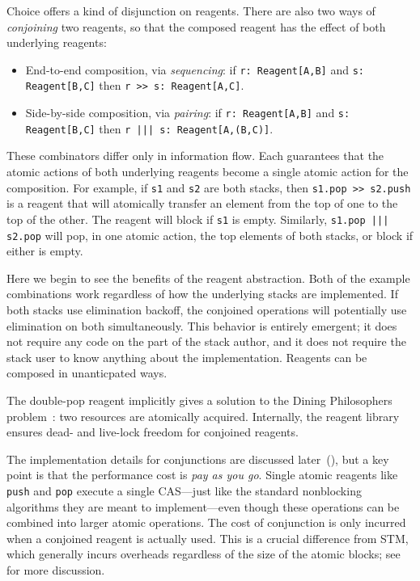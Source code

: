 \documentclass[preprint]{sigplanconf}
\begin{document}
Choice offers a kind of disjunction on reagents.  There are also two
ways of \emph{conjoining} two reagents, so that the composed reagent
has the effect of both underlying reagents:
\begin{itemize} %
\item End-to-end composition, via \emph{sequencing}: if 
  \lstinline{r: Reagent[A,B]} and \lstinline{s: Reagent[B,C]} then 
  \lstinline{r >> s: Reagent[A,C]}.
\item Side-by-side composition, via \emph{pairing}: if 
  \lstinline{r: Reagent[A,B]} and \lstinline{s: Reagent[B,C]} then 
  \lstinline{r ||| s: Reagent[A,(B,C)]}.  
\end{itemize}
These combinators differ only in information flow.  Each guarantees
that the atomic actions of both underlying reagents become a single
atomic action for the composition.  For example, if \lstinline{s1} and
\lstinline{s2} are both stacks, then \lstinline{s1.pop >> s2.push} is
a reagent that will atomically transfer an element from the top of one
to the top of the other.  The reagent will block if \lstinline{s1} is
empty.  Similarly, \lstinline{s1.pop ||| s2.pop} will pop, in one
atomic action, the top elements of both stacks, or block if either is
empty.

Here we begin to see the benefits of the reagent abstraction.  Both of
the example combinations work regardless of how the underlying stacks
are implemented.  If both stacks use elimination backoff, the
conjoined operations will potentially use elimination on both
simultaneously.  This behavior is entirely emergent; it does not
require any code on the part of the stack author, and it does not
require the stack user to know anything about the implementation.
Reagents can be composed in unanticpated ways.

The double-pop reagent implicitly gives a solution to the Dining
Philosophers problem~\cite{?}: two resources are atomically acquired.
Internally, the reagent library ensures dead- and live-lock freedom
for conjoined reagents.

The implementation details for conjunctions are discussed
later~(), but a key point is that the performance cost
is \emph{pay as you go}.  Single atomic reagents like \lstinline{push} and
\lstinline{pop} execute a single CAS---just like the standard nonblocking
algorithms they are meant to implement---even though these operations can be
combined into larger atomic operations.  The cost of conjunction is only
incurred when a conjoined reagent is actually used.  This is a crucial
difference from STM, which generally incurs overheads regardless of the size
of the atomic blocks; see~ for more discussion.
\end{document}
